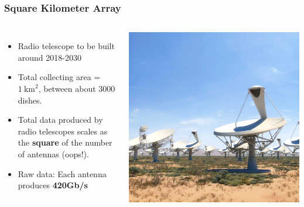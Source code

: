 \documentclass[10pt, compress]{beamer}
\begin{document}
\begin{frame}[fragile]
    \frametitle{Square Kilometer Array}
    \begin{columns}
            \begin{itemize}
                \item Radio telescope to be built around 2018-2030
                \item Total collecting area = $1~\mathrm{km}^2$, between about 3000 dishes.
                \item Total data produced by radio telescopes scales as the \textbf{square} of the number of antennas (oops!).
                \item Raw data: Each antenna produces \textbf{420Gb/s}
            \end{itemize}
            \vspace{.01cm}
            \includegraphics[height=\textheight]{assets/ska_dish_mid_africa_closeup.jpg}
    \end{columns}
\end{frame}
\end{document}
